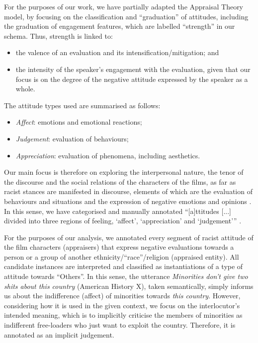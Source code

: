 \documentclass[output=paper]{LSP/langsci}
\begin{document}
For the purposes of our work, we have partially adapted the Appraisal Theory model, by focusing on the classification and “graduation” of attitudes, including the graduation of engagement features, which are labelled “strength” in our schema. Thus, strength is linked to:

\begin{itemize}
\item the valence of an evaluation and its intensification/mitigation; and
\item the intensity of the speaker's engagement with the evaluation, given that our focus is on the degree of the negative attitude expressed by the speaker as a whole.
\end{itemize}

The attitude types used are summarised as follows:
\begin{itemize}
\item \textit{Affect}: emotions and emotional reactions;
\item \textit{Judgement}: evaluation of behaviours;
\item \textit{Appreciation}: evaluation of phenomena, including aesthetics.
\end{itemize}

Our main focus is therefore on exploring the interpersonal nature, the tenor of the discourse and the social relations of the characters of the films, as far as racist stances are manifested in discourse, elements of which are the evaluation of behaviours and situations and the expression of negative emotions and opinions \citep[see][]{Fotopoulou2009}. In this sense, we have categorised and manually annotated “[a]ttitudes [...] divided into three regions of feeling, ‘affect’, ‘appreciation’ and ‘judgement’” \citep[35--43]{MartinWhite2005}. 

For the purposes of our analysis, we annotated every segment of racist attitude of the film characters (appraisers) that express negative evaluations towards a person or a group of another ethnicity/“race”/religion (appraised entity). All candidate instances are interpreted and classified as instantiations of a type of attitude towards “Others”. In this sense, the utterance \textit{Minorities don't give two shits about this country} (American History X), taken semantically, simply informs us about the indifference (affect) of minorities towards \textit{this country}. However, considering how it is used in the given context, we focus on the interlocutor’s intended meaning, which is to implicitly criticise the members of minorities as indifferent free-loaders who just want to exploit the country. Therefore, it is annotated as an implicit judgement.
\end{document}
